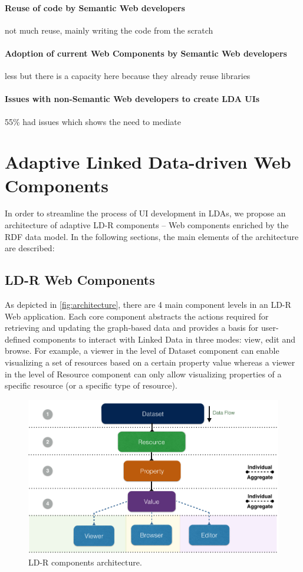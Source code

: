 \documentclass{acm_proc_article-sp}
\begin{document}
 
\paragraph{Reuse of code by Semantic Web developers}
not much reuse, mainly writing the code from the scratch

\paragraph{Adoption of current Web Components by Semantic Web developers}
less but there is a capacity here because they already reuse libraries

\paragraph{Issues with non-Semantic Web developers to create LDA UIs}
55\% had issues which shows the need to mediate

\section{Adaptive Linked Data-driven Web Components}
In order to streamline the process of UI development in LDAs, we propose an architecture of adaptive LD-R components -- Web components enriched by the RDF data model.
In the following sections, the main elements of the architecture are described:

\subsection{LD-R Web Components}
As depicted in \autoref{fig:architecture}, there are 4 main component levels in an LD-R Web application.
Each core component abstracts the actions required for retrieving and updating the graph-based data and provides a basis for user-defined components to interact with Linked Data in three modes: view, edit and browse.
For example, a viewer in the level of Dataset component can enable visualizing a set of resources based on a certain property value whereas a viewer in the level of Resource component can only allow visualizing properties of a specific resource (or a specific type of resource).

\begin{figure}[tb]
  \includegraphics[width=1\linewidth]{images/architecture.jpg}
  \caption{LD-R components architecture.}
  \label{fig:architecture}
\end{figure}
\end{document}
